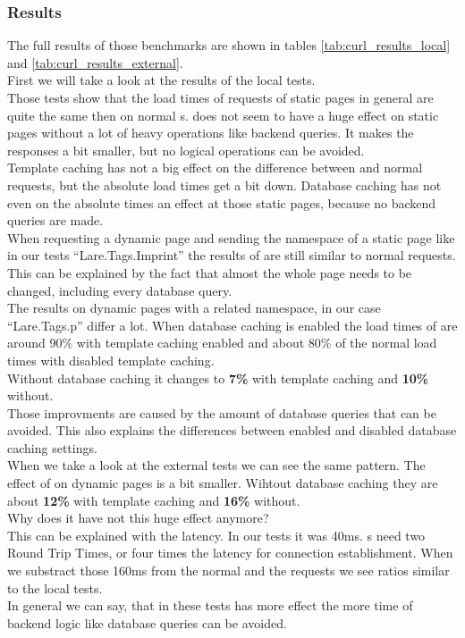 \subsubsection{Results}

The full results of those benchmarks are shown in tables \ref{tab:curl_results_local} and \ref{tab:curl_results_external}.
\\
First we will take a look at the results of the local tests.
\\
Those tests show that the load times of \lare{} requests of static pages in general are quite the same then on normal \httpRequest{}s.
\lare{} does not seem to have a huge effect on static pages without a lot of heavy operations like backend queries. It makes the responses a bit smaller, but no logical operations can be avoided.
\\
Template caching has not a big effect on the difference between \lare{} and normal requests, but the absolute load times get a bit down.
Database caching has not even on the absolute times an effect at those static pages, because no backend queries are made.
\\
When requesting a dynamic page and sending the namespace of a static page like in our tests \enquote{Lare.Tags.Imprint} the results of \lare{} are still similar to normal requests.
This can be explained by the fact that almost the whole page needs to be changed, including every database query.
\\
The results on dynamic pages with a related namespace, in our case \enquote{Lare.Tags.p} differ a lot.
When database caching is enabled the load times of \lare{} are around 90\% with template caching enabled and about 80\% of the normal load times with disabled template caching.
\\
Without database caching it changes to \textbf{7\%} with template caching and \textbf{10\%} without.
\\
Those improvments are caused by the amount of database queries that can be avoided. This also explains the differences between enabled and disabled database caching settings.
\\
When we take a look at the external tests we can see the same pattern.
The effect of \lare{} on dynamic pages is a bit smaller.
Wihtout database caching they are about \textbf{12\%} with template caching and \textbf{16\%} without.
\\
Why does it have not this huge effect anymore?
\\
This can be explained with the latency.
In our tests it was 40ms.
\httpRequest{}s need two Round Trip Times, or four times the latency for connection establishment.
When we substract those 160ms from the normal and the \lare{} requests we see ratios similar to the local tests.
\\
In general we can say, that in these tests \lare{} has more effect the more time of backend logic like database queries can be avoided.

